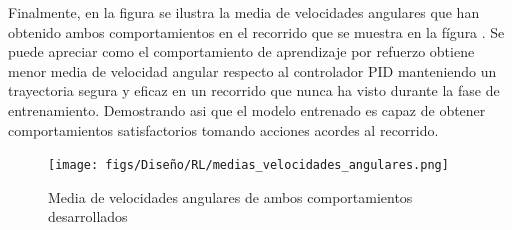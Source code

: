 Finalmente, en la figura se ilustra la media de velocidades angulares que han obtenido ambos comportamientos en el recorrido que se muestra en la fígura . Se puede apreciar 
como el comportamiento de aprendizaje por refuerzo obtiene menor media de velocidad angular respecto al controlador PID manteniendo un trayectoria segura y eficaz en un recorrido 
que nunca ha visto durante la fase de entrenamiento. Demostrando asi que el modelo entrenado es capaz de obtener comportamientos satisfactorios tomando acciones acordes
al recorrido. 

\begin{figure} [H]
  \begin{center}
    \texttt{[image: figs/Diseño/RL/medias\_velocidades\_angulares.png]}
  \end{center}
  \caption{Media de velocidades angulares de ambos comportamientos desarrollados}
  \label{fig:media_velocidades}
\end{figure}\

















        


  

